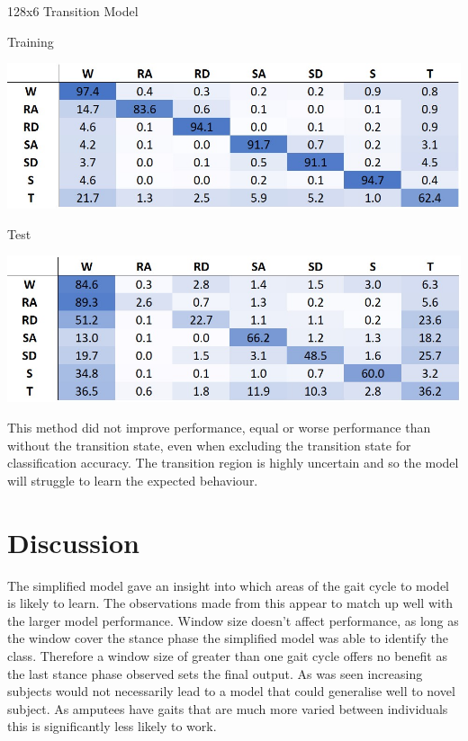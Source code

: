 \documentclass[sensors,article,submit,moreauthors,pdftex]{Definitions/mdpi}
\begin{document}
\begin{table}[!hbt]
    \centering
    \caption{128x6 Transition Model}
    \label{tab:128x32_transition_confusion_matrix}
    \begin{subtable}{.45\textwidth}
        \centering
        \caption{Training}
        \label{tab:tran_model_conf_matrix_training_128x32}
        \includegraphics[width=\textwidth]{Figures/results/conf_matricies/Training_128x32_T.jpg}
    \end{subtable}
    \hfil
    \begin{subtable}{.45\textwidth}
        \centering
        \caption{Test}
        \label{tab:tran_model_conf_matrix_test_128x32}
        \includegraphics[width=\textwidth]{Figures/results/conf_matricies/Test_128x32_T.jpg}
    \end{subtable}
\end{table}

This method did not improve performance, equal or worse performance than without the transition state, even when excluding the transition state for classification accuracy. The transition region is highly uncertain and so the model will struggle to learn the expected behaviour.

\section{Discussion}%
The simplified model gave an insight into which areas of the gait cycle to model is likely to learn. The observations made from this appear to match up well with the larger model performance. Window size doesn't affect performance, as long as the window cover the stance phase the simplified model was able to identify the class. Therefore a window size of greater than one gait cycle offers no benefit as the last stance phase observed sets the final output. As was seen increasing subjects would not necessarily lead to a model that could generalise well to novel subject. As amputees have gaits that are much more varied between individuals this is significantly less likely to work.
\end{document}
